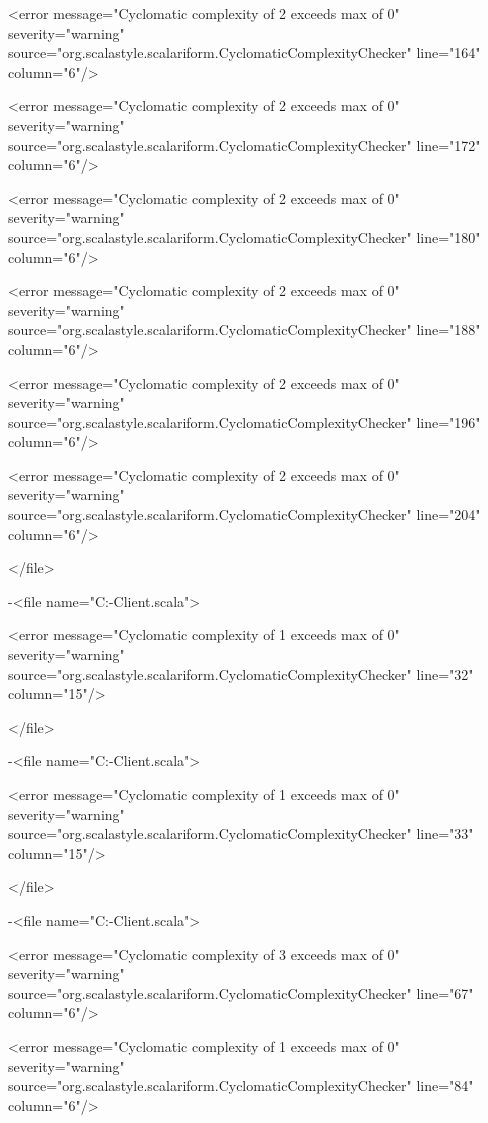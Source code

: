 \documentclass{scalatekids-article}
\begin{document}
<error message="Cyclomatic complexity of 2 exceeds max of 0" severity="warning" source="org.scalastyle.scalariform.CyclomaticComplexityChecker" line="164" column="6"/>

<error message="Cyclomatic complexity of 2 exceeds max of 0" severity="warning" source="org.scalastyle.scalariform.CyclomaticComplexityChecker" line="172" column="6"/>

<error message="Cyclomatic complexity of 2 exceeds max of 0" severity="warning" source="org.scalastyle.scalariform.CyclomaticComplexityChecker" line="180" column="6"/>

<error message="Cyclomatic complexity of 2 exceeds max of 0" severity="warning" source="org.scalastyle.scalariform.CyclomaticComplexityChecker" line="188" column="6"/>

<error message="Cyclomatic complexity of 2 exceeds max of 0" severity="warning" source="org.scalastyle.scalariform.CyclomaticComplexityChecker" line="196" column="6"/>

<error message="Cyclomatic complexity of 2 exceeds max of 0" severity="warning" source="org.scalastyle.scalariform.CyclomaticComplexityChecker" line="204" column="6"/>

</file>


-<file name="C:\Users\Davide\Documents\GitHub\Actorbase-Client\src\main\scala\com\actorbase\cli\models\CreateCollectionCommand.scala">

<error message="Cyclomatic complexity of 1 exceeds max of 0" severity="warning" source="org.scalastyle.scalariform.CyclomaticComplexityChecker" line="32" column="15"/>

</file>


-<file name="C:\Users\Davide\Documents\GitHub\Actorbase-Client\src\main\scala\com\actorbase\cli\models\FindCommand.scala">

<error message="Cyclomatic complexity of 1 exceeds max of 0" severity="warning" source="org.scalastyle.scalariform.CyclomaticComplexityChecker" line="33" column="15"/>

</file>


-<file name="C:\Users\Davide\Documents\GitHub\Actorbase-Client\src\main\scala\com\actorbase\driver\data\ActorbaseCollection.scala">

<error message="Cyclomatic complexity of 3 exceeds max of 0" severity="warning" source="org.scalastyle.scalariform.CyclomaticComplexityChecker" line="67" column="6"/>

<error message="Cyclomatic complexity of 1 exceeds max of 0" severity="warning" source="org.scalastyle.scalariform.CyclomaticComplexityChecker" line="84" column="6"/>
\end{document}
